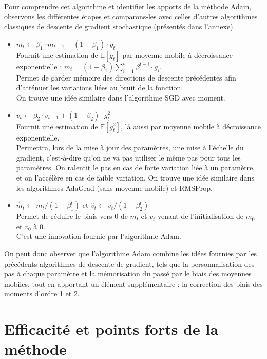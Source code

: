 \documentclass[11pt,a4paper, french]{article}
\newcommand{\dsum}[2]{\displaystyle\sum_{#1}^{#2}}
\newcommand{\bit}{\begin{itemize}}
\newcommand{\eit}{\end{itemize}}
\begin{document}
Pour comprendre cet algorithme et identifier les apports de la méthode Adam, observons les différentes étapes et comparons-les avec celles d'autres algorithmes classiques de descente de gradient stochastique (présentés dans l'annexe).

\bit
\item $m_t \longleftarrow \beta_1\cdotp m_{t-1}+(1-\beta_1)\cdotp g_t$\\
Fournit une estimation de $\mathbb E[g_t]$ par moyenne mobile à décroissance exponentielle : $m_t=(1-\beta_1)\dsum{i=1}t\beta_1^{t-i}\cdotp g_i$.\\
Permet de garder mémoire des directions de descente précédentes afin d'atténuer les variations liées au bruit de la fonction.\\
On trouve une idée similaire dans l'algorithme SGD avec moment.

\item $v_t \longleftarrow \beta_2\cdotp v_{t-1}+(1-\beta_2)\cdotp g_t^2$\\
Fournit une estimation de $\mathbb E[g_t^2]$, là aussi par moyenne mobile à décroissance exponentielle.\\
Permettra, lors de la mise à jour des paramètres, une mise à l'échelle du gradient, c'est-à-dire qu'on ne va pas utiliser le même pas pour tous les paramètres. On ralentit le pas en cas de forte variation liée à un paramètre, et on l'accélère en cas de faible variation. 
On trouve une idée similaire dans les algorithmes AdaGrad (sans moyenne mobile) et RMSProp. 
\item  $\widehat m_t \longleftarrow m_t/(1-\beta_1^t)$ et 
$\widehat v_t \longleftarrow v_t/(1-\beta_2^t)$\\
Permet de réduire le biais vers 0 de $m_t$ et $v_t$ venant de l'initialisation de $m_0$ et $v_0$ à 0. \\
C'est une innovation fournie par l'algorithme Adam.
\eit

On peut donc observer que l'algorithme Adam combine les idées fournies par les précédents algorithmes de descente de gradient, tels que la personnalisation des pas à chaque paramètre et la mémorisation du passé par le biais des moyennes mobiles, tout en apportant un élément supplémentaire : la correction des biais des moments d'ordre 1 et 2. 



\section{Efficacité et points forts de la méthode}
\end{document}
